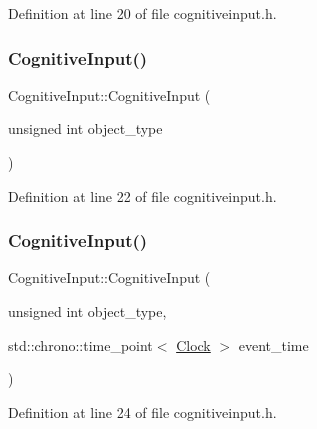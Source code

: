 Definition at line 20 of file cognitiveinput.\+h.

\mbox{\label{class_cognitive_input_a220c07f5be517afe47b4d3c486c4152e}} 
\subsubsection{\texorpdfstring{Cognitive\+Input()}{CognitiveInput()}\hspace{0.1cm}{\footnotesize\ttfamily [2/4]}}
{\footnotesize\ttfamily Cognitive\+Input\+::\+Cognitive\+Input (\begin{DoxyParamCaption}\item[{unsigned int}]{object\+\_\+type }\end{DoxyParamCaption})\hspace{0.3cm}{\ttfamily [inline]}}



Definition at line 22 of file cognitiveinput.\+h.

\mbox{\label{class_cognitive_input_a31cc06426ab41c39ec8c795ab29d43de}} 
\subsubsection{\texorpdfstring{Cognitive\+Input()}{CognitiveInput()}\hspace{0.1cm}{\footnotesize\ttfamily [3/4]}}
{\footnotesize\ttfamily Cognitive\+Input\+::\+Cognitive\+Input (\begin{DoxyParamCaption}\item[{unsigned int}]{object\+\_\+type,  }\item[{std\+::chrono\+::time\+\_\+point$<$ \hyperlink{universe_8h_a0ef8d951d1ca5ab3cfaf7ab4c7a6fd80}{Clock} $>$}]{event\+\_\+time }\end{DoxyParamCaption})\hspace{0.3cm}{\ttfamily [inline]}}



Definition at line 24 of file cognitiveinput.\+h.

\mbox{\label{class_cognitive_input_a230ebb8f019af7e0bff51c13bc10c580}} 
